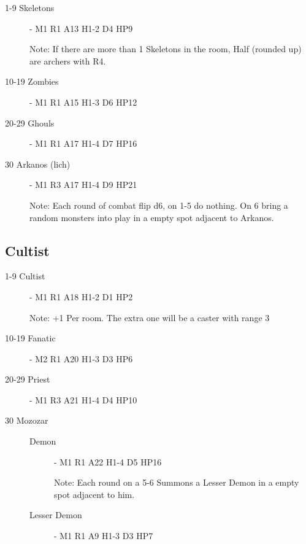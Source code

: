 \documentclass[a6paper,hidelinks]{article}
\begin{document}
\begin{description}

\item[1-9 Skeletons] - M1 R1 A13 H1-2 D4 HP9

Note: If there are more than 1 Skeletons in the room, Half (rounded up) are archers with R4.

\item[10-19 Zombies] - M1 R1 A15 H1-3 D6 HP12

\item[20-29 Ghouls] - M1 R1 A17 H1-4 D7 HP16

\item[30 Arkanos (lich)] - M1 R3 A17 H1-4 D9 HP21

Note: Each round of combat flip d6, on 1-5 do nothing. On 6 bring a random monsters into play in a empty spot adjacent to Arkanos.

\end{description}

\subsection{Cultist}

\begin{description}

\item[1-9 Cultist] - M1 R1 A18 H1-2 D1 HP2

Note: +1 Per room. The extra one will be a caster with range 3

\item[10-19 Fanatic] - M2 R1 A20 H1-3 D3 HP6

\item[20-29 Priest] - M1 R3 A21 H1-4 D4 HP10

\item[30 Mozozar] \hspace{1cm}

\begin{description}

\item[Demon] - M1 R1 A22 H1-4 D5 HP16

Note: Each round on a 5-6 Summons a Lesser Demon in a empty spot adjacent to him.
\item[Lesser Demon] - M1 R1 A9 H1-3 D3 HP7

\end{description}

\end{description}

\end{document}
